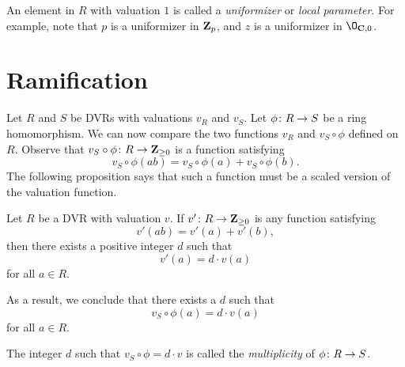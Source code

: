 \documentclass[12pt]{article}
\begin{document}
An element in $R$ with valuation $1$ is called a \emph{uniformizer} or \emph{local parameter}.
For example, note that $p$ is a uniformizer in ${\bf Z}_p$, and $z$ is a uniformizer in $\O_{\C, 0}$.

\section{Ramification}
Let $R$ and $S$ be DVRs with valuations $v_R$ and $v_S$.
Let $\phi {\colon} R \to S$ be a ring homomorphism.
We can now compare the two functions $v_R$ and $v_S \circ \phi$ defined on $R$.
Observe that $v_S \circ \phi {\colon} R \to {\bf Z}_{\geq 0}$ is a function satisfying
\[ v_S \circ \phi (ab) = v_S\circ \phi (a) + v_S\circ\phi(b).\]
The following proposition says that such a function must be a scaled version of the valuation function.
\begin{proposition}
  Let $R$ be a DVR with valuation $v$.
  If $v' {\colon} R \to {\bf Z}_{\geq 0}$ is any function satisfying
  \[ v'(ab) = v'(a) + v'(b),\]
  then there exists a positive integer $d$ such that
  \[ v'(a) = d \cdot v(a)\]
  for all $a \in R$.
\end{proposition}
As a result, we conclude that there exists a $d$ such that
\[ v_S\circ\phi(a) = d \cdot v(a)\]
for all $a \in R$.
\begin{definition}
  The integer $d$ such that $v_S \circ \phi = d \cdot v$ is called the \emph{multiplicity} of $\phi {\colon} R \to S$.
\end{definition}
\end{document}
